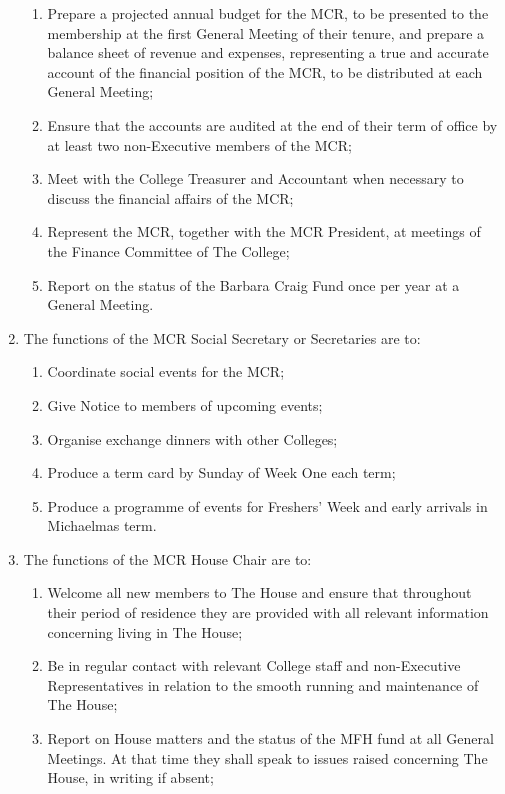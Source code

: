 \documentclass[11pt, a4paper]{article}
\begin{document}
\begin{enumerate}
\begin{enumerate}
        \item Prepare a projected annual budget for the MCR, to be presented to the membership at the first General Meeting of their tenure, and prepare a balance sheet of revenue and expenses, representing a true and accurate account of the financial position of the MCR, to be distributed at each General Meeting;
        \item Ensure that the accounts are audited at the end of their term of office by at least two non-Executive members of the MCR;
        \item Meet with the College Treasurer and Accountant when necessary to discuss the financial affairs of the MCR;
        \item Represent the MCR, together with the MCR President, at meetings of the Finance Committee of The College;
        \item Report on the status of the Barbara Craig Fund once per year at a General Meeting.
    \end{enumerate}
    \item The functions of the MCR Social Secretary or Secretaries are to:
    \begin{enumerate}
        \item Coordinate social events for the MCR;
        \item Give Notice to members of upcoming events;
        \item Organise exchange dinners with other Colleges;
        \item Produce a term card by Sunday of Week One each term;
        \item Produce a programme of events for Freshers' Week and early arrivals in Michaelmas term.
    \end{enumerate}
    \item The functions of the MCR House Chair are to:
    \begin{enumerate}
        \item Welcome all new members to The House and ensure that throughout their period of residence they are provided with all relevant information concerning living in The House;
        \item Be in regular contact with relevant College staff and non-Executive Representatives in relation to the smooth running and maintenance of The House;
        \item Report on House matters and the status of the MFH fund at all General Meetings. At that time they shall speak to issues raised concerning The House, in writing if absent;

\end{enumerate}
\end{enumerate}
\end{document}
